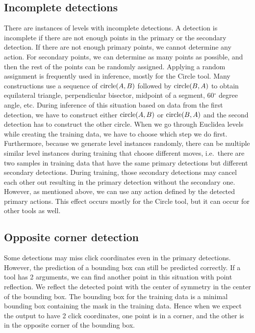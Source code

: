 \subsection{Incomplete detections}
There are instances of levels with incomplete detections. A detection is incomplete if there are not enough points in the primary or the secondary detection. If there are not enough primary points, we cannot determine any action. For secondary points, we can determine as many points as possible, and then the rest of the points can be randomly assigned. Applying a random assignment is frequently used in inference, mostly for the Circle tool. Many constructions use a sequence of $\operatorname{circle}(A, B)$ followed by $\operatorname{circle}(B, A)$ to obtain equilateral triangle, perpendicular bisector, midpoint of a segment, 60$^{\circ}$ degree angle, etc. During inference of this situation based on data from the first detection, we have to construct either $\operatorname{circle}(A, B)$ or $\operatorname{circle}(B, A)$ and the second detection has to construct the other circle. When we go through Euclidea levels while creating the training data, we have to choose which step we do first.
Furthermore, because we generate level instances randomly, there can be multiple similar level instances during training that choose different moves, i.e.~there are two samples in training data that have the same primary detections but different secondary detections. During training, those secondary detections may cancel each other out resulting in the primary detection without the secondary one. However, as mentioned above, we can use any action defined by the detected primary actions. This effect occurs mostly for the Circle tool, but it can occur for other tools as well.
\subsection{Opposite corner detection}
Some detections may miss click coordinates even in the primary detections. However, the prediction of a bounding box can still be predicted correctly. If a tool has 2 arguments, we can find another point in this situation with point reflection. We reflect the detected point with the center of symmetry in the center of the bounding box. The bounding box for the training data is a minimal bounding box containing the mask in the training data. Hence when we expect the output to have 2 click coordinates, one point is in a corner, and the other is in the opposite corner of the bounding box.

